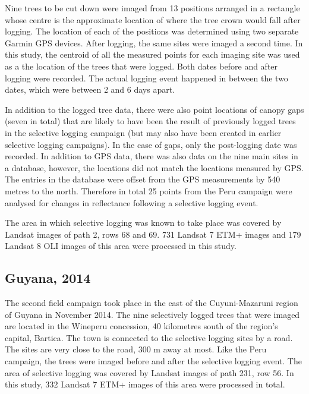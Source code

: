\documentclass[a4paper,12pt]{scrbook}
\begin{document}
Nine trees to be cut down were imaged from 13 positions arranged in a rectangle whose centre is the approximate location of where the tree crown would fall after logging. The location of each of the positions was determined using two separate Garmin \ac{GPS} devices. After logging, the same sites were imaged a second time. In this study, the centroid of all the measured points for each imaging site was used as a the location of the trees that were logged. Both dates before and after logging were recorded. The actual logging event happened in between the two dates, which were between 2 and 6 days apart.

In addition to the logged tree data, there were also point locations of canopy gaps (seven in total) that are likely to have been the result of previously logged trees in the selective logging campaign (but may also have been created in earlier selective logging campaigns). In the case of gaps, only the post-logging date was recorded. In addition to \ac{GPS} data, there was also data on the nine main sites in a database, however, the locations did not match the locations measured by GPS. The entries in the database were offset from the GPS measurements by 540 metres to the north. Therefore in total 25 points from the Peru campaign were analysed for changes in reflectance following a selective logging event.

The area in which selective logging was known to take place was covered by Landsat images of path 2, rows 68 and 69. 731 Landsat 7 \ac{ETM+} images and 179 Landsat 8 \ac{OLI} images of this area were processed in this study.

\subsection{Guyana, 2014}

The second field campaign took place in the east of the Cuyuni-Mazaruni region of Guyana in November 2014. The nine selectively logged trees that were imaged are located in the Wineperu concession, 40 kilometres south of the region's capital, Bartica. The town is connected to the selective logging sites by a road. The sites are very close to the road, 300 m away at most. Like the Peru campaign, the trees were imaged before and after the selective logging event. The area of selective logging was covered by Landsat images of path 231, row 56. In this study, 332 Landsat 7 \ac{ETM+} images of this area were processed in total.
\end{document}

